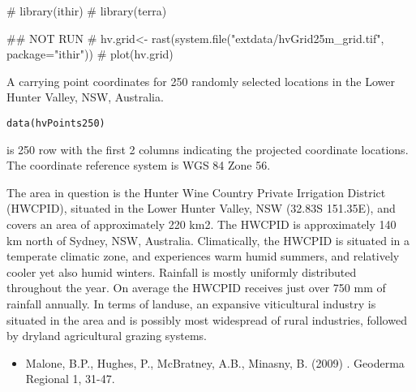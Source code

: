 \documentclass[a4paper]{book}
\begin{document}
%
\begin{Examples}
\begin{ExampleCode}
# library(ithir)
# library(terra)

## NOT RUN
# hv.grid<- rast(system.file("extdata/hvGrid25m_grid.tif", package="ithir"))
# plot(hv.grid)

\end{ExampleCode}
\end{Examples}
%
\begin{Description}
A  carrying point coordinates for 250 randomly selected locations in the Lower Hunter Valley, NSW, Australia.
\end{Description}
%
\begin{Usage}
\begin{verbatim}
data(hvPoints250)
\end{verbatim}
\end{Usage}
%
\begin{Format}
 is 250 row  with the first 2 columns indicating the projected coordinate locations. The coordinate reference system is WGS 84 Zone 56. 
\end{Format}
%
\begin{Details}
The area in question is the Hunter Wine Country Private Irrigation District (HWCPID), situated in the Lower Hunter Valley, NSW (32.83S 151.35E), and covers an area of approximately 220 km2. The HWCPID is approximately 140 km north of Sydney, NSW, Australia. Climatically, the HWCPID is situated in a temperate climatic zone, and experiences warm humid summers, and relatively cooler yet also humid winters. Rainfall is mostly uniformly distributed throughout the year. On average the HWCPID receives just over 750 mm of rainfall annually. In terms of landuse, an expansive viticultural industry is situated in the area and is possibly most widespread
of rural industries, followed by dryland agricultural grazing systems.
\end{Details}
%
\begin{References}
\begin{itemize}

\item{} Malone, B.P., Hughes, P.,  McBratney, A.B., Minasny, B. (2009) . Geoderma Regional 1, 31-47.

\end{itemize}

\end{References}
\end{document}
